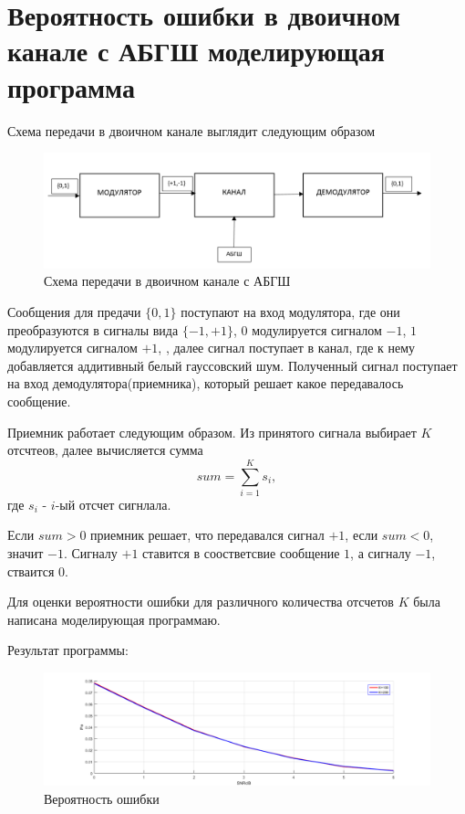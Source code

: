	\section{Вероятность ошибки в двоичном канале с АБГШ моделирующая программа}
	Схема передачи в двоичном канале выглядит следующим образом
	\begin{figure}[h]
		\centering
		\includegraphics[scale=0.5]{img/Glebov_1.png}
		\caption{Схема передачи в двоичном канале с АБГШ}
		\label{Glebov.image1}
	\end{figure}
	
	Сообщения для предачи $\{0,1\}$ поступают на вход модулятора, где они преобразуются в сигналы вида 
	$\{-1,+1\}$, $0$ модулируется сигналом $-1$, $1$ модулируется сигналом $+1$, , 
	далее сигнал поступает в канал, где к нему добавляется аддитивный белый гауссовский шум. 
	Полученный сигнал поступает на вход демодулятора(приемника), который решает какое передавалось сообщение.
	
	Приемник работает следующим образом. Из принятого сигнала выбирает $K$ отсчтеов, далее вычисляется сумма
	\begin{equation}
		sum=\sum_{i=1}^{K}s_i,
	\end{equation}
	где $s_i$ - $i$-ый отсчет сигнлала.
	
	Если $sum>0$ приемник решает, что передавался сигнал $+1$, если $sum<0$, значит $-1$. 
	Сигналу $+1$ ставится в соостветсвие сообщение $1$, а сигналу $-1$, стваится $0$.
	
	Для оценки вероятности ошибки для различного количества отсчетов $K$ была написана моделирующая программаю.
	
	Результат программы:
	\begin{figure}[h]
		\centering
		\includegraphics[scale=0.4]{img/Glebov_g.png}
		\caption{Вероятность ошибки}
		\label{Glebov.image2}
	\end{figure}
	
